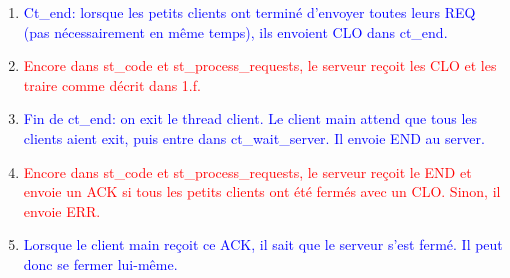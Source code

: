 \documentclass[11pt]{article}
\begin{document}
\begin{enumerate}[label=\alph*.]
\begin{enumerate}[label =\roman*.]
   \end{enumerate}
 \item \textcolor{blue}{Ct\_end: lorsque les petits clients ont terminé d’envoyer toutes leurs REQ (pas nécessairement en même temps), ils envoient CLO dans ct\_end.}
 \item \textcolor{red}{Encore dans st\_code et st\_process\_requests, le serveur reçoit les CLO et les traire comme décrit dans 1.f.}
 \item \textcolor{blue}{Fin de ct\_end: on exit le thread client. Le client main attend que tous les clients aient exit, puis entre dans ct\_wait\_server. Il envoie END au server.}
 \item \textcolor{red}{Encore dans st\_code et st\_process\_requests, le serveur reçoit le END et envoie un ACK si tous les petits clients ont été fermés avec un CLO. Sinon, il envoie ERR.}
 \item \textcolor{blue}{Lorsque le client main reçoit ce ACK, il sait que le serveur s’est fermé. Il peut donc se fermer lui-même.}\\\\
 \end{enumerate}
\end{document}
